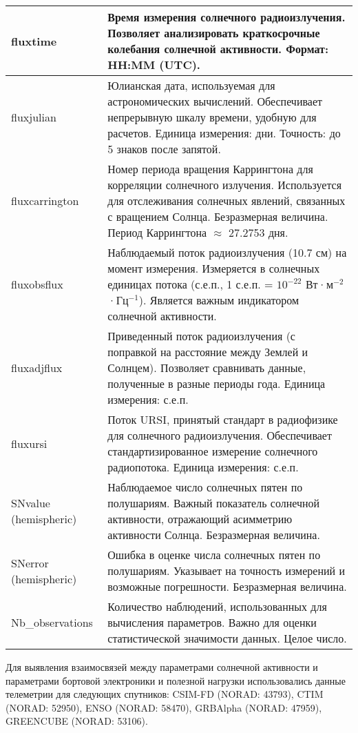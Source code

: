 \documentclass[14pt, a4paper]{src/bsu}
\begin{document}
\begin{longtable}{|l|p{12cm}|}
	\\ \hline fluxtime              & Время измерения солнечного
	радиоизлучения. Позволяет анализировать краткосрочные колебания
	солнечной активности. Формат: HH:MM (UTC).
	\\ \hline fluxjulian            & Юлианская дата, используемая для
	астрономических вычислений. Обеспечивает непрерывную шкалу времени,
	удобную для расчетов. Единица измерения: дни. Точность: до 5 знаков
	после запятой.
	\\ \hline fluxcarrington        & Номер периода вращения
	Каррингтона для корреляции солнечного излучения. Используется для
	отслеживания солнечных явлений, связанных с вращением Солнца.
	Безразмерная величина. Период Каррингтона $\approx$ 27.2753 дня.
	\\ \hline fluxobsflux           & Наблюдаемый поток радиоизлучения
	(10.7 см) на момент измерения. Измеряется в солнечных единицах
	потока (с.е.п., 1 с.е.п. = \(10^{-22}\) Вт·м\(^{-2}\)·Гц\(^{-1}\)).
	Является важным индикатором солнечной активности.
	\\ \hline fluxadjflux           & Приведенный поток радиоизлучения
	(с поправкой на расстояние между Землей и Солнцем). Позволяет
	сравнивать данные, полученные в разные периоды года. Единица
	измерения: с.е.п.
	\\ \hline fluxursi              & Поток URSI, принятый стандарт в
	радиофизике для солнечного радиоизлучения. Обеспечивает
	стандартизированное измерение солнечного радиопотока. Единица
	измерения: с.е.п.
	\\ \hline SNvalue (hemispheric) & Наблюдаемое число солнечных пятен
	по полушариям. Важный показатель солнечной активности, отражающий
	асимметрию активности Солнца. Безразмерная величина.
	\\ \hline SNerror (hemispheric) & Ошибка в оценке числа солнечных
	пятен по полушариям. Указывает на точность измерений и возможные
	погрешности. Безразмерная величина.
	\\ \hline Nb\_observations      & Количество наблюдений,
	использованных для вычисления параметров. Важно для оценки
	статистической значимости данных. Целое число.
	\\\end{longtable}

Для выявления взаимосвязей между параметрами солнечной активности и
параметрами бортовой электроники и полезной нагрузки использовались
данные телеметрии для следующих спутников: CSIM-FD (NORAD: 43793),
CTIM (NORAD: 52950), ENSO (NORAD: 58470), GRBAlpha (NORAD: 47959),
GREENCUBE (NORAD: 53106).
\end{document}
